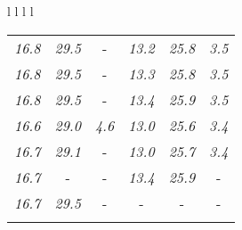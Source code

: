 \documentclass[sigplan,screen]{acmart}
\makeatletter
\newcommand{\ccell}[3][]{%
  \kern-\fboxsep
  \if\relax\detokenize{#1}\relax
    \expandafter\@firstoftwo
  \else
    \expandafter\@secondoftwo
  \fi
  {\colorbox{#2}}%
  {\colorbox[#1]{#2}}%
  {#3}\kern-\fboxsep
}
\makeatother
\begin{document}
\begin{table*}
\begin{tabular}{l l l l}
\begin{tabular}{c c c c c c}
      \textit{16.8} & \textit{29.5} &  \ccell[gray]{0.9}{\textit{4.7}} & \textit{13.2} & \textit{25.8} & \textit{3.5} \\
      \textit{16.8} & \textit{29.5} &  \ccell[gray]{0.9}{\textit{4.7}} & \textit{13.3} & \textit{25.8} & \textit{3.5} \\
      \textit{16.8} & \textit{29.5} &  \ccell[gray]{0.9}{\textit{4.7}} & \textit{13.4} & \textit{25.9} & \textit{3.5} \\
      \textit{16.6} & \textit{29.0} & \textit{4.6} & \textit{13.0} & \textit{25.6} & \textit{3.4} \\
      \textit{16.7} & \textit{29.1} &  \ccell[gray]{0.9}{\textit{4.7}} & \textit{13.0} & \textit{25.7} & \textit{3.4} \\
      \textit{16.7} &  \ccell[gray]{0.9}{\textit{29.6}} &  \ccell[gray]{0.9}{\textit{4.7}} & \textit{13.4} & \textit{25.9} &  \ccell[gray]{0.9}{\textit{3.6}} \\
      \textit{16.7} & \textit{29.5} &  \ccell[gray]{0.9}{\textit{4.7}} &  \ccell[gray]{0.9}{\textit{13.5}} &  \ccell[gray]{0.9}{\textit{26.0}} &  \ccell[gray]{0.9}{\textit{3.6}} \\
      
      \rule{0pt}{4ex}    
      

\end{tabular}
\end{tabular}
\end{table*}
\end{document}
